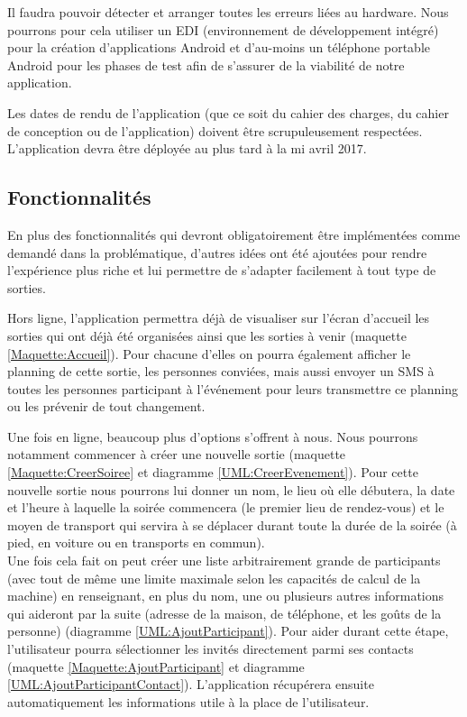 \documentclass[a4paper, 12pt, notitlepage]{article} %
\begin{document}
Il faudra pouvoir détecter et arranger toutes les erreurs liées au hardware. Nous pourrons pour cela utiliser un EDI (environnement de développement intégré) pour la création d'applications Android et d'au-moins un téléphone portable Android pour les phases de test afin de s'assurer de la viabilité de notre application.  

Les dates de rendu de l'application (que ce soit du cahier des charges, du cahier de conception ou de l'application) doivent être scrupuleusement respectées. L'application devra être déployée au plus tard à la mi avril 2017.  

\subsection{Fonctionnalités}
En plus des fonctionnalités qui devront obligatoirement être implémentées comme demandé dans la problématique, d'autres idées ont été ajoutées pour rendre l'expérience plus riche et lui permettre de s'adapter facilement à tout type de sorties.

Hors ligne, l'application permettra déjà de visualiser sur l'écran d'accueil les sorties qui ont déjà été organisées ainsi que les sorties à venir (maquette \ref{Maquette:Accueil}). Pour chacune d'elles on pourra également afficher le planning de cette sortie, les personnes conviées, mais aussi envoyer un SMS à toutes les personnes participant à l'événement pour leurs transmettre ce planning ou les prévenir de tout changement.

Une fois en ligne, beaucoup plus d'options s'offrent à nous. Nous pourrons notamment commencer à créer une nouvelle sortie (maquette \ref{Maquette:CreerSoiree} et diagramme \ref{UML:CreerEvenement}).
Pour cette nouvelle sortie nous pourrons lui donner un nom, le lieu où elle débutera, la date et l'heure à laquelle la soirée commencera (le premier lieu de rendez-vous) et le moyen de transport qui servira à se déplacer durant toute la durée de la soirée (à pied, en voiture ou en transports en commun).\\
Une fois cela fait on peut créer une liste arbitrairement grande de participants (avec tout de même une limite maximale selon les capacités de calcul de la machine) en renseignant, en plus du nom, une ou plusieurs autres informations qui aideront par la suite (adresse de la maison, \no de téléphone, et les goûts de la personne) (diagramme \ref{UML:AjoutParticipant}). Pour aider durant cette étape, l'utilisateur pourra sélectionner les invités directement parmi ses contacts (maquette \ref{Maquette:AjoutParticipant} et diagramme \ref{UML:AjoutParticipantContact}). L'application récupérera ensuite automatiquement les informations utile à la place de l'utilisateur.
\end{document}
